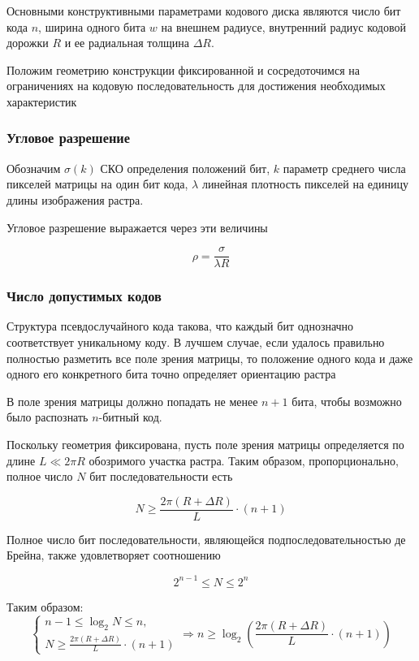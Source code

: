 Основными конструктивными параметрами кодового диска являются число бит кода $n$, ширина одного бита $w$ на внешнем радиусе, внутренний радиус кодовой дорожки $R$ и ее радиальная толщина $\Delta R$.

Положим геометрию конструкции фиксированной и сосредоточимся на ограничениях на кодовую последовательность для достижения необходимых характеристик

\subsubsection{Угловое разрешение}

Обозначим $\sigma(k)$ СКО определения положений бит, $k$ параметр среднего числа пикселей матрицы на один бит кода, $\lambda$ линейная плотность пикселей на единицу длины изображения растра.

Угловое разрешение выражается через эти величины

\begin{equation} \label{eq:resolution}
    \boxed{\rho = \dfrac{\sigma}{\lambda R}}
\end{equation}

\subsubsection{Число допустимых кодов}

Структура псевдослучайного кода такова, что каждый бит однозначно соответствует уникальному коду. В лучшем случае, если удалось правильно полностью разметить все поле зрения матрицы, то положение одного кода и даже одного его конкретного бита точно определяет ориентацию растра

В поле зрения матрицы должно попадать не менее $n+1$ бита, чтобы возможно было распознать $n$-битный код.

Поскольку геометрия фиксирована, пусть поле зрения матрицы определяется по длине $L \ll 2\pi R$ обозримого участка растра. Таким образом, пропорционально, полное число $N$ бит последовательности есть

$$N \geq \frac{2\pi (R+\Delta R)}{L}\cdot(n+1)$$

Полное число бит последовательности, являющейся подпоследовательностью де Брейна, также удовлетворяет соотношению 

$$2^{n-1} \leq N \leq 2^n$$

Таким образом:
\begin{equation}
\label{eq:code_len}
    \begin{cases} n-1\leq \log_2N\leq n,\\
    N \geq \frac{2\pi (R+\Delta R)}{L}\cdot(n+1)
    \end{cases} \Rightarrow \boxed{n \geq \log_2\left(\dfrac{2\pi (R+\Delta R)}{L}\cdot(n+1)\right)}
\end{equation}

